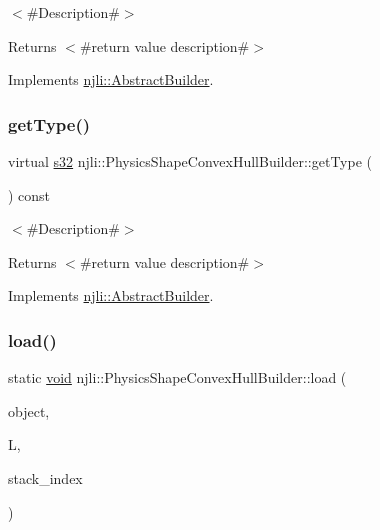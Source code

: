 $<$\#\+Description\#$>$

\begin{DoxyReturn}{Returns}
$<$\#return value description\#$>$ 
\end{DoxyReturn}


Implements \mbox{\hyperlink{classnjli_1_1_abstract_builder_a0f2d344fcf697b167f4f2b1122b5fb33}{njli\+::\+Abstract\+Builder}}.

\mbox{\label{classnjli_1_1_physics_shape_convex_hull_builder_a844516ec483973fc1d0264c7c4c3f79b}} 
\subsubsection{\texorpdfstring{get\+Type()}{getType()}}
{\footnotesize\ttfamily virtual \mbox{\hyperlink{_util_8h_aa62c75d314a0d1f37f79c4b73b2292e2}{s32}} njli\+::\+Physics\+Shape\+Convex\+Hull\+Builder\+::get\+Type (\begin{DoxyParamCaption}{ }\end{DoxyParamCaption}) const\hspace{0.3cm}{\ttfamily [virtual]}}

$<$\#\+Description\#$>$

\begin{DoxyReturn}{Returns}
$<$\#return value description\#$>$ 
\end{DoxyReturn}


Implements \mbox{\hyperlink{classnjli_1_1_abstract_builder_abb4a8161cd71be12807fe85864b67050}{njli\+::\+Abstract\+Builder}}.

\mbox{\label{classnjli_1_1_physics_shape_convex_hull_builder_ab016cc01e763bcba040840b98a80690c}} 
\subsubsection{\texorpdfstring{load()}{load()}}
{\footnotesize\ttfamily static \mbox{\hyperlink{_thread_8h_af1e856da2e658414cb2456cb6f7ebc66}{void}} njli\+::\+Physics\+Shape\+Convex\+Hull\+Builder\+::load (\begin{DoxyParamCaption}\item[{\mbox{\hyperlink{classnjli_1_1_physics_shape_convex_hull_builder}{Physics\+Shape\+Convex\+Hull\+Builder}} \&}]{object,  }\item[{lua\+\_\+\+State $\ast$}]{L,  }\item[{int}]{stack\+\_\+index }\end{DoxyParamCaption})\hspace{0.3cm}{\ttfamily [static]}}

